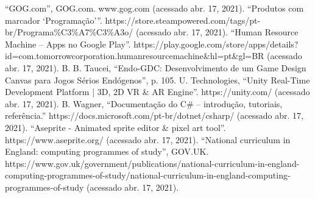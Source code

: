 \documentclass[conference]{IEEEtran}
\begin{document}
\begin{thebibliography}{23}
 ``GOG.com'', GOG.com. www.gog.com (acessado abr. 17, 2021).
 ``Produtos com marcador ‘Programação’''. https://store.steampowered.com/tags/pt-br/Programa\%C3\%A7\%C3\%A3o/ (acessado abr. 17, 2021).
 ``Human Resource Machine – Apps no Google Play''. https://play.google.com/store/apps/details?id=com.tomorrowcorporation.\linebreak humanresourcemachine\&hl=pt\&gl=BR (acessado abr. 17, 2021).
 B. B. Taucei, ``Endo-GDC: Desenvolvimento de um Game Design Canvas para Jogos Sérios Endógenos'', p. 105.
 U. Technologies, ``Unity Real-Time Development Platform | 3D, 2D VR \& AR Engine''. https://unity.com/ (acessado abr. 17, 2021).
 B. Wagner, ``Documentação do C\# – introdução, tutoriais, referência.'' https://docs.microsoft.com/pt-br/dotnet/csharp/ (acessado abr. 17, 2021).
 ``Aseprite - Animated sprite editor \& pixel art tool''. https://www.aseprite.org/ (acessado abr. 17, 2021).
 ``National curriculum in England: computing programmes of study'', GOV.UK. https://www.gov.uk/government/publications/national-curriculum-in-england-computing-programmes-of-study/national-curriculum-in-england-computing-programmes-of-study (acessado abr. 17, 2021).

\end{thebibliography}
\end{document}
